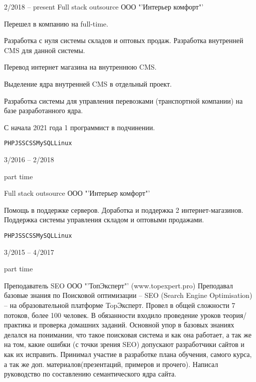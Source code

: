 \documentclass[10pt]{tpl/developercv} %
\begin{document}



\begin{entrylist}
	\entry
		{2/2018 -- present}
		{Full stack outsource}
		{ООО "'Интерьер комфорт"' }
		{
    Перешел в компанию на full-time.

    Разработка с нуля системы складов и оптовых продаж. Разработка внутренней CMS для данной системы.

		Перевод интернет магазина на внутреннюю CMS.

		Выделение ядра внутренней CMS в отдельный проект.

		Разработка системы для управления перевозками (транспортной компании) на базе разработанного ядра.

		С начала 2021 года 1 программист в подчинении.

		\texttt{PHP}\slashsep\texttt{JS}\slashsep\texttt{SCSS}\slashsep\texttt{MySQL}\slashsep\texttt{Linux}}

	\entry
		{3/2016 -- 2/2018

		\footnotesize{part time}}
		{Full stack outsource}
		{ООО "'Интерьер комфорт"' }
		{Помощь в поддержке серверов. Доработка и поддержка 2 интернет-магазинов. Поддержка системы управления складом и оптовыми продажами.

		\texttt{PHP}\slashsep\texttt{JS}\slashsep\texttt{SCSS}\slashsep\texttt{MySQL}\slashsep\texttt{Linux}}

	\entry
		{3/2015 -- 4/2017

		\footnotesize{part time}}
		{Преподаватель SEO}
		{ООО "'ТопЭксперт"' (www.topexpert.pro)}
		{Преподавал базовые знания по Поисковой оптимизации -- SEO (Search Engine Optimisation) -- на образовательной платформе TopЭксперт. Провел в общей сложности 7 потоков, более 100 человек. В обязанности входило проведение уроков теория/практика и проверка домашних заданий. Основной упор в базовых знаниях делался на понимании, что такое поисковая система и как она работает, а так же на том, какие ошибки (с точки зрения SEO) допускают разработчики сайтов и как их исправить. Принимал участие в разработке плана обучения, самого курса, а так же доп. материалов(презентаций, примеров и прочего). Написал руководство по составлению семантического ядра сайта.}


\end{entrylist}
\end{document}
